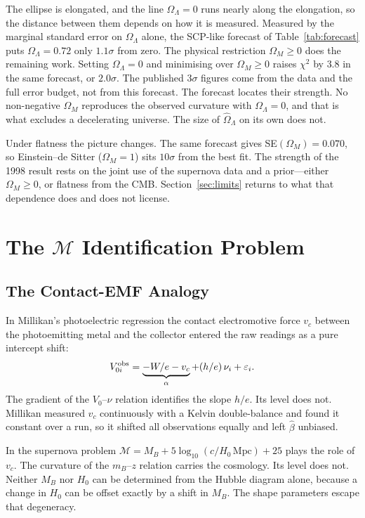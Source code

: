 \documentclass[12pt]{article}
\begin{document}
The ellipse is elongated, and the line $\Omega_\Lambda = 0$ runs nearly along
the elongation, so the distance between them depends on how it is measured.
Measured by the marginal standard error on $\Omega_\Lambda$ alone, the
SCP-like forecast of Table~\ref{tab:forecast} puts $\Omega_\Lambda = 0.72$
only $1.1\sigma$ from zero.  The physical restriction $\Omega_M \geq 0$ does
the remaining work.  Setting $\Omega_\Lambda = 0$ and minimising over
$\Omega_M \geq 0$ raises $\chi^2$ by $3.8$ in the same forecast, or
$2.0\sigma$.  The published $3\sigma$ figures come from the data and the full
error budget, not from this forecast.  The forecast locates their strength.
No non-negative $\Omega_M$ reproduces the observed curvature with
$\Omega_\Lambda = 0$, and that is what excludes a decelerating universe.  The
size of $\hat\Omega_\Lambda$ on its own does not.

Under flatness the picture changes.  The same forecast gives
SE$(\Omega_M) = 0.070$, so Einstein--de Sitter ($\Omega_M = 1$) sits $10\sigma$
from the best fit.  The strength of the 1998 result rests on the joint use of
the supernova data and a prior---either $\Omega_M \geq 0$, or flatness from the
CMB.  Section~\ref{sec:limits} returns to what that dependence does and does
not license.

\section{The $\mathcal{M}$ Identification Problem}
\label{sec:nuisance}

\subsection{The Contact-EMF Analogy}

In Millikan's photoelectric regression the contact electromotive force $v_c$
between the photoemitting metal and the collector entered the raw readings as
a pure intercept shift:
\[
  V_{0i}^{\rm obs} = \underbrace{-W/e - v_c}_{\alpha}
    + (h/e)\,\nu_i + \varepsilon_i.
\]
The gradient of the $V_0$--$\nu$ relation identifies the slope $h/e$.  Its
level does not.  Millikan measured $v_c$ continuously with a Kelvin
double-balance and found it constant over a run, so it shifted all
observations equally and left $\hat\beta$ unbiased.

In the supernova problem $\mathcal{M} = M_B + 5\log_{10}(c/H_0\,\text{Mpc})
+ 25$ plays the role of $v_c$.  The curvature of the $m_B$--$z$ relation
carries the cosmology.  Its level does not.  Neither $M_B$ nor $H_0$ can be
determined from the Hubble diagram alone, because a change in $H_0$ can be
offset exactly by a shift in $M_B$.  The shape parameters escape that
degeneracy.
\end{document}
